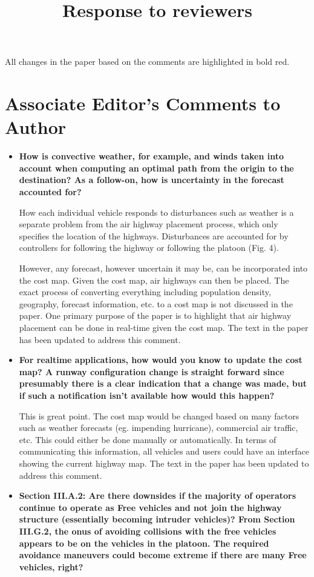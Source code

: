 \documentclass[submit]{aiaa-pretty}
\title{Response to reviewers}
\begin{document}
\maketitle

All changes in the paper based on the comments are highlighted in bold red.

\section{Associate Editor's Comments to Author}
\begin{itemize}
\item\textbf{How is convective weather, for example, and winds taken into account when computing an optimal path from the origin to the destination?  As a follow-on, how is uncertainty in the forecast accounted for?}

How each individual vehicle responds to disturbances such as weather is a separate problem from the air highway placement process, which only specifies the location of the highways. Disturbances are accounted for by controllers for following the highway or following the platoon (Fig. 4). 

However, any forecast, however uncertain it may be, can be incorporated into the cost map. Given the cost map, air highways can then be placed. The exact process of converting everything including population density, geography, forecast information, etc. to a cost map is not discussed in the paper. One primary purpose of the paper is to highlight that air highway placement can be done in real-time given the cost map. The text in the paper has been updated to address this comment.

\item\textbf{For realtime applications, how would you know to update the cost map?  A runway configuration change is straight forward since presumably there is a clear indication that a change was made, but if such a notification isn’t available how would this happen?}

This is great point. The cost map would be changed based on many factors such as weather forecasts (eg. impending hurricane), commercial air traffic, etc. This could either be done manually or automatically. In terms of communicating this information, all vehicles and users could have an interface showing the current highway map. The text in the paper has been updated to address this comment.

\item\textbf{Section III.A.2: Are there downsides if the majority of operators continue to operate as Free vehicles and not join the highway structure (essentially becoming intruder vehicles)?  From Section III.G.2, the onus of avoiding collisions with the free vehicles appears to be on the vehicles in the platoon.  The required avoidance maneuvers could become extreme if there are many Free vehicles, right?}


\end{itemize}
\end{document}
